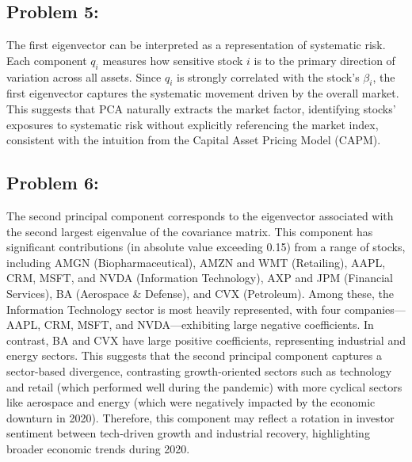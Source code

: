 \documentclass{report}
\begin{document}
\begin{center}
\end{center}
\newpage

\subsection*{Problem 5:}
The first eigenvector can be interpreted as a representation of systematic risk. Each component $q_i$ measures how sensitive stock $i$ is to the primary direction of variation across all assets. Since $q_i$ is strongly correlated with the stock’s $\beta_i$, the first eigenvector captures the systematic movement driven by the overall market. This suggests that PCA naturally extracts the market factor, identifying stocks' exposures to systematic risk without explicitly referencing the market index, consistent with the intuition from the Capital Asset Pricing Model (CAPM).\\


\newpage

\subsection*{Problem 6:}

The second principal component corresponds to the eigenvector associated with the second largest eigenvalue of the covariance matrix. This component has significant contributions (in absolute value exceeding 0.15) from a range of stocks, including AMGN (Biopharmaceutical), AMZN and WMT (Retailing), AAPL, CRM, MSFT, and NVDA (Information Technology), AXP and JPM (Financial Services), BA (Aerospace \& Defense), and CVX (Petroleum). Among these, the Information Technology sector is most heavily represented, with four companies—AAPL, CRM, MSFT, and NVDA—exhibiting large negative coefficients. In contrast, BA and CVX have large positive coefficients, representing industrial and energy sectors. This suggests that the second principal component captures a sector-based divergence, contrasting growth-oriented sectors such as technology and retail (which performed well during the pandemic) with more cyclical sectors like aerospace and energy (which were negatively impacted by the economic downturn in 2020). Therefore, this component may reflect a rotation in investor sentiment between tech-driven growth and industrial recovery, highlighting broader economic trends during 2020. \\
\end{document}
